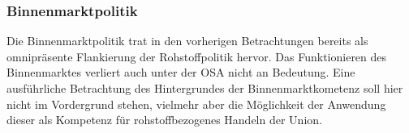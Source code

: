 \documentclass[12pt,a4paper,oneside]{book} %
\begin{document}
\subsubsection{Binnenmarktpolitik}
	
Die Binnenmarktpolitik trat in den vorherigen Betrachtungen bereits als omnipräsente Flankierung der Rohstoffpolitik hervor. Das Funktionieren des Binnenmarktes verliert auch unter der OSA nicht an Bedeutung. Eine ausführliche Betrachtung des Hintergrundes der Binnenmarktkometenz soll hier nicht im Vordergrund stehen, vielmehr aber die Möglichkeit der Anwendung dieser als Kompetenz für rohstoffbezogenes Handeln der Union.

\end{document}
